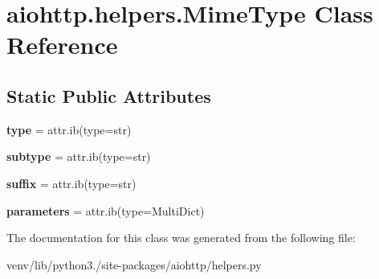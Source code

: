 \hypertarget{classaiohttp_1_1helpers_1_1_mime_type}{}\section{aiohttp.\+helpers.\+Mime\+Type Class Reference}
\label{classaiohttp_1_1helpers_1_1_mime_type}
\subsection*{Static Public Attributes}
\begin{DoxyCompactItemize}
\item 
\mbox{\label{classaiohttp_1_1helpers_1_1_mime_type_a4eb66187a60bc620a41a9f5e086d8040}} 
{\bfseries type} = attr.\+ib(type=str)
\item 
\mbox{\label{classaiohttp_1_1helpers_1_1_mime_type_acd9713ca12c6e934c7ca4be862ae6ca2}} 
{\bfseries subtype} = attr.\+ib(type=str)
\item 
\mbox{\label{classaiohttp_1_1helpers_1_1_mime_type_adeb1c429501112b3014379d2e9da377b}} 
{\bfseries suffix} = attr.\+ib(type=str)
\item 
\mbox{\label{classaiohttp_1_1helpers_1_1_mime_type_a6ac2e5720c0a071466ac5476df2f97f3}} 
{\bfseries parameters} = attr.\+ib(type=Multi\+Dict)
\end{DoxyCompactItemize}


The documentation for this class was generated from the following file\+:\begin{DoxyCompactItemize}
\item 
venv/lib/python3./site-\/packages/aiohttp/helpers.\+py\end{DoxyCompactItemize}
